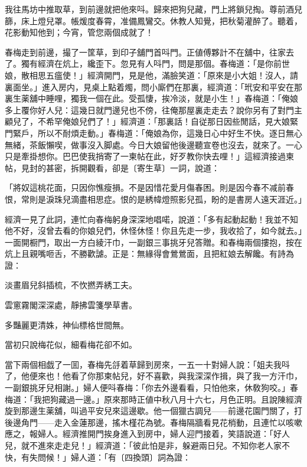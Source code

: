 \begin{myquote}
我往馬坊中推取草，到前邊就把他來呌。歸來把狗兒藏，門上將鎖兒掏。尊前酒兒篩，床上燈兒罩。帳煖度春霄，准備鳳鸞交。休教人知覺，把秋菊灌醉了。聽着，花影動知他到；今宵，管您兩個成就了！
\end{myquote}

春梅走到前邊，撮了一筐草，到印子舖門首呌門。正値傅夥計不在舖中，往家去了。獨有經濟在炕上，纔歪下。忽見有人呌門，問是那個。春梅道：「是你前世娘，散相思五瘟使！」經濟開門，見是他，滿臉笑道：「原來是小大姐！沒人，請裏面坐。」進入房内，見桌上點着燭，問小廝們在那裏，經濟道：「玳安和平安在那裏生薬舖中睡哩，獨我一個在此。受孤悽，挨冷淡，就是小生！」春梅道：「俺娘多上覆你好人兒：這幾日就門邊兒也不傍，往俺那屋裏走走去？說你另有了對門主顧兒了，不希罕俺娘兒們了！」經濟道：「那裏話！自従那日因些閒話，見大娘緊門緊戶，所以不耐煩走動。」春梅道：「俺娘為你，這幾日心中好生不快。逐日無心無緒，茶飯懶喫，做事沒入脚處。今日大娘留他後邊聽宣卷也沒去，就來了。一心只是牽掛想你。巴巴使我捎寄了一柬帖在此，好歹教你快去哩！」這經濟接過柬帖，見封的甚密，拆開觀看，卻是〔寄生草〕一詞，說道：

\begin{myquote}
「將奴這桃花面，只因你憔瘦損。不是因惜花愛月傷春困。則是因今春不减前春恨，常則是淚珠兒滴盡相思症。恨的是綉幃燈照影兒孤，盼的是書房人遠天涯近。」
\end{myquote}

經濟一見了此詞，連忙向春梅躬身深深地唱喏，說道：「多有起動起動！我並不知他不好，沒曾去看的你娘兒們，休怪休怪！你且先走一步，我收拾了，如今就去。」一面開橱門，取出一方白綾汗巾，一副銀三事挑牙兒答贈。和春梅兩個摟抱，按在炕上且親嘴咂舌，不勝歡謔。正是：無緣得會鶯鶯面，且把紅娘去解饞。有詩為證：

\begin{myquote}
淡畫眉兒斜插梳，不忺撚弄綉工夫。

雲窻霧閣深深處，靜拂雲箋學草書。

多豔麗更清姝，神仙標格世間無。

當初只說梅花似，細看梅花卻不如。
\end{myquote}

當下兩個相戯了一囬，春梅先㧱着草歸到房來，一五一十對婦人說：「姐夫我呌了，他便來也！他看了你那柬帖兒，好不喜歡，與我深深作揖，與了我一方汗巾，一副銀挑牙兒相謝。」婦人便呌春梅：「你去外邊看看，只怕他來，休敎狗咬。」春梅道：「我把狗藏過一邊。」原來那時正値中秋八月十六七，月色正明。且說陳經濟旋到那邊生薬舖，叫過平安兒來這邊歇。他一個獵古調兒——前邊花園門關了，打後邊角門——走入金蓮那邊，搖木槿花為號。春梅隔牆看見花梢動，且連忙以咳嗽應之，報婦人。經濟推開門挨身進入到房中，婦人迎門接着，笑語說道：「好人兒，就不進來走走兒！」經濟道：「彼此怕是非，躲避兩日兒。不知你老人家不快，有失問候！」婦人道：「有〔四換頭〕詞為證：

